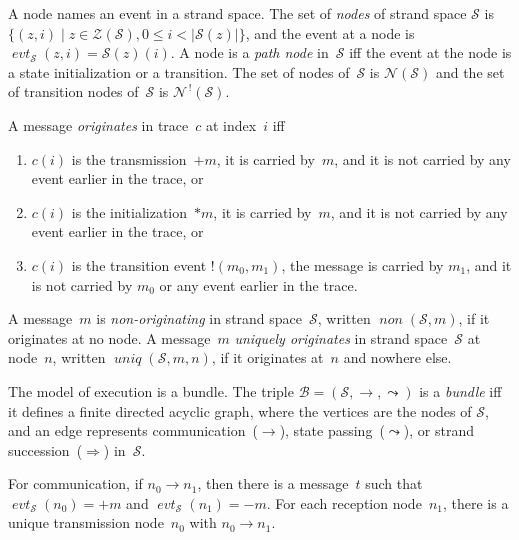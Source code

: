 \documentclass[12pt]{article}
\newcommand{\fn}[1]{\ensuremath{\operatorname{\mathit{#1}}}}
\newcommand{\inbnd}{\mathord -}
\newcommand{\outbnd}{\mathord +}
\newcommand{\start}{\mathord\ast}
\newcommand{\sync}{\mathord !}
\newcommand{\ssp}{\ensuremath{\mathcal{S}}}
\newcommand{\bun}{\ensuremath{\mathcal{B}}}
\newcommand{\strands}{\ensuremath{\mathcal{Z}}}
\newcommand{\nodes}{\ensuremath{\mathcal{N}}}
\newcommand{\nnodes}{\nodes^{\,!}}
\newcommand{\evt}{\fn{evt}}
\begin{document}
A node names an event in a strand space.  The set of \emph{nodes} of
strand space $\ssp$ is $\{(z,i)\mid z\in\strands(\ssp), 0\leq i <
|\ssp(z)|\}$, and the event at a node is $\evt_\ssp(z,i)=\ssp(z)(i)$.
A node is a \emph{path node} in~$\ssp$ iff the event at the node is a
state initialization or a transition.  The set of nodes of~$\ssp$ is
$\nodes(\ssp)$ and the set of transition nodes of~$\ssp$ is $\nnodes(\ssp)$.

A message \emph{originates} in trace~$c$ at index~$i$ iff
\begin{enumerate}
\item $c(i)$ is the transmission~$\outbnd m$, it is carried by~$m$,
  and it is not carried by any event earlier in the trace, or
\item $c(i)$ is the initialization~$\start m$, it is carried by~$m$,
  \marginpar{!}
  and it is not carried by any event earlier in the trace, or
\item $c(i)$ is the transition event $\sync(m_0,m_1)$, the message is
  carried by $m_1$, and it is not carried by $m_0$ or any event
  earlier in the trace.
\end{enumerate}

A message~$m$ is \emph{non-originating} in strand space~$\ssp$,
written $\fn{non}(\ssp,m)$, if it originates at no node.  A
message~$m$ \emph{uniquely originates} in strand space~$\ssp$ at
node~$n$, written $\fn{uniq}(\ssp,m,n)$, if it originates at~$n$ and
nowhere else.

The model of execution is a bundle.  The triple
$\bun=(\ssp,\to,\leadsto)$ is a \emph{bundle} iff it defines a finite
directed acyclic graph, where the vertices are the nodes of $\ssp$,
and an edge represents communication~($\to$), state
passing~($\leadsto$), or strand succession~($\Rightarrow$) in~$\ssp$.

For communication, if $n_0\rightarrow n_1$, then there is a
message~$t$ such that $\evt_\ssp(n_0)=\outbnd m$
and $\evt_\ssp(n_1)=\inbnd m$.  For each reception node~$n_1$, there
is a unique transmission node~$n_0$ with $n_0\to n_1$.
\end{document}
